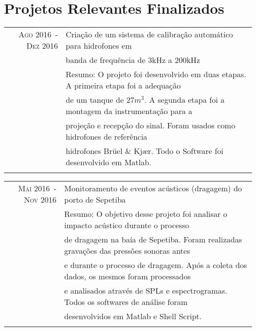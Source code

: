 \documentclass[a4paper,10pt]{article}
\begin{document}
\section{Projetos Relevantes Finalizados}
\begin{tabular}{rl}

    \textsc{Ago 2016~-~Dez 2016}    & Criação de um sistema de calibração automático para hidrofones em \\
                                    & banda de frequência de 3kHz a 200kHz \\
                                    &\footnotesize{Resumo: O projeto foi desenvolvido em duas etapas. A primeira etapa foi a adequação}\\
                                    &\footnotesize{de um tanque de $27m^3$. A segunda etapa foi a montagem da instrumentação para a}\\
                                    &\footnotesize{projeção e recepção do sinal. Foram usados como hidrofones de referência}\\
                                    &\footnotesize{hidrofones Brüel \& Kjær. Todo o Software foi desenvolvido em Matlab.} \\
                                    &\\
\end{tabular}
\begin{tabular}{rl}

    \textsc{Mai 2016~-~Nov 2016}    & Monitoramento de eventos acústicos (dragagem) do porto de Sepetiba\\
                                    &\footnotesize{Resumo: O objetivo desse projeto foi analisar o impacto acústico durante o processo}\\
                                    &\footnotesize{de dragagem na baía de Sepetiba. Foram realizadas gravações das pressões sonoras antes}\\
                                    &\footnotesize{e durante o processo de dragagem. Após a coleta dos dados, os mesmos foram processados}\\ 
                                    &\footnotesize{e analisados através de SPLs e espectrogramas. Todos os softwares de análise foram }\\
                                    &\footnotesize{desenvolvidos em Matlab e Shell Script.} \\
                                    &\\


\end{tabular}
\end{document}
